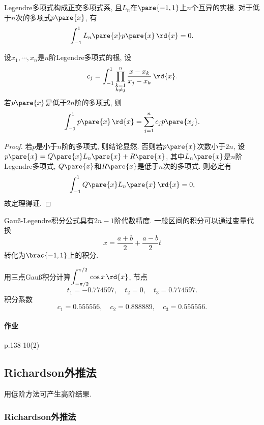 \documentclass[hidelinks]{ctexart}
\begin{document}
Legendre多项式构成正交多项式系, 且$L_n$在$\pare{-1,1}$上$n$个互异的实根. 对于低于$n$次的多项式$p\pare{x}$, 有
\[ \int_{-1}^1 L_n\pare{x}p\pare{x}\,\rd{x} = 0. \]
\begin{theorem}
    设$x_1,\cdots,x_n$是$n$阶Legendre多项式的根, 设
    \[ c_j = \int_{-1}^1 \prod_{\substack{k=1\\k\neq j}}^n \frac{x-x_k}{x_j - x_k}\,\rd{x}. \]
    若$p\pare{x}$是低于$2n$阶的多项式, 则
    \[ \int_{-1}^1 p\pare{x}\,\rd{x} = \sum_{j=1}^n c_jp\pare{x_j}. \]
\end{theorem}
\begin{proof}
    若$p$是小于$n$阶的多项式, 则结论显然. 否则若$p\pare{x}$次数小于$2n$, 设$p\pare{x} = Q\pare{x} L_n\pare{x} + R\pare{x}$, 其中$L_n\pare{x}$是$n$阶Legendre多项式, $Q\pare{x}$和$R\pare{x}$是低于$n$次的多项式. 则必定有
    \[ \int_{-1}^1 Q\pare{x}L_n\pare{x}\,\rd{x} = 0, \]
    故定理得证.
\end{proof}
Gau\ss-Legendre积分公式具有$2n-1$阶代数精度. 一般区间的积分可以通过变量代换
\[ x = \frac{a+b}{2} + \frac{a-b}{2}t \]
转化为$\brac{-1,1}$上的积分.
\begin{ex}
    用三点Gau\ss 积分计算$\displaystyle \int_{-\pi/2}^{\pi/2} \cos x\,\rd{x}$, 节点
    \[ t_1 = -0.774597,\quad t_2 = 0,\quad t_3 = 0.774597. \]
    积分系数
    \[ c_1 = 0.555556,\quad c_2 = 0.888889,\quad c_3 = 0.555556. \]
\end{ex}

\paragraph{作业} %
\label{par:作业}

p.138 10(2)




\subsection{Richardson外推法} %
\label{sub:richardson外推法}

用低阶方法可产生高阶结果.

\subsubsection{Richardson外推法} %
\label{ssub:richardson外推法}
\end{document}
